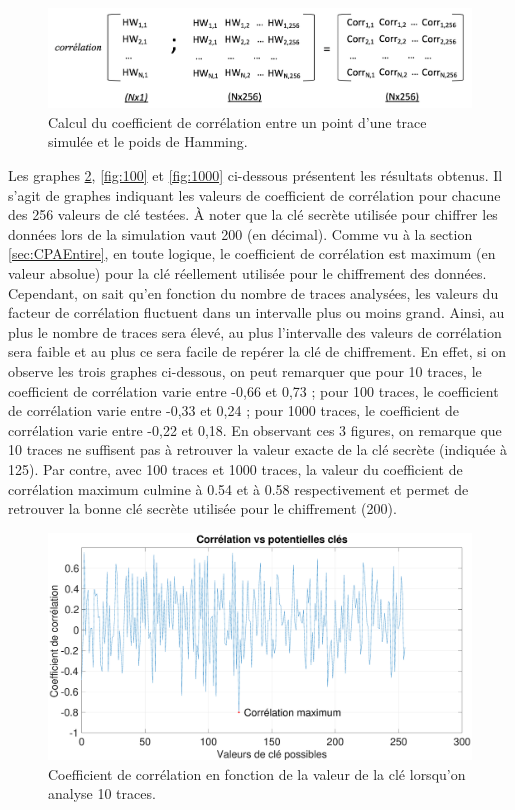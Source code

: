 \documentclass[10pt, oneside, a4paper]{article}
\begin{document}
\begin{figure}[htbp]
    \centering
    \includegraphics[scale=0.35]{image/CorrEx1}
    \caption{Calcul du coefficient de corrélation entre un point d'une trace simulée et le poids de Hamming.}
    \label{fig:CorrEx1} 
\end{figure}

\newpage

Les graphes \ref{fig:10}, \ref{fig:100} et \ref{fig:1000} ci-dessous présentent les résultats obtenus. Il s'agit de graphes indiquant les valeurs de coefficient de corrélation pour chacune des 256 valeurs de clé testées. À noter que la clé secrète utilisée pour chiffrer les données lors de la simulation vaut 200 (en décimal). Comme vu à la section \ref{sec:CPAEntire}, en toute logique, le coefficient de corrélation est maximum (en valeur absolue) pour la clé réellement utilisée pour le chiffrement des données. Cependant, on sait qu'en fonction du nombre de traces analysées, les valeurs du facteur de corrélation fluctuent dans un intervalle plus ou moins grand. Ainsi, au plus le nombre de traces sera élevé, au plus l'intervalle des valeurs de corrélation sera faible et au plus ce sera facile de repérer la clé de chiffrement. En effet, si on observe les trois graphes ci-dessous, on peut remarquer que pour 10 traces, le coefficient de corrélation varie entre -0,66 et 0,73 ; pour 100 traces, le coefficient de corrélation varie entre -0,33 et 0,24 ; pour 1000 traces, le coefficient de corrélation varie entre -0,22 et 0,18. En observant ces 3 figures, on remarque que 10 traces ne suffisent pas à retrouver la valeur exacte de la clé secrète (indiquée à 125). Par contre, avec 100 traces et 1000 traces, la valeur du coefficient de corrélation maximum culmine à 0.54 et à 0.58 respectivement et permet de retrouver la bonne clé secrète utilisée pour le chiffrement (200).

\begin{figure}[htbp]
    \centering
    \hspace{-1.2 cm}
    \includegraphics[scale=0.25]{image/10.eps}    \caption{Coefficient de corrélation en fonction de la valeur de la clé lorsqu'on analyse 10 traces.}    \label{fig:10}
\end{figure}
\end{document}
